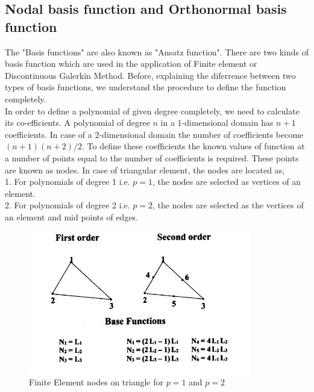 \documentclass[a4paper,12pt]{book}
\begin{document}
\subsection{Nodal basis function and Orthonormal basis function}

The "Basis functions" are also known as "Ansatz function". There are two kinds of basis function which are used in the application of Finite element or Discontinuous Galerkin Method. 
Before, explaining the diferrence between two types of basis functions, we understand the procedure to define the function completely. \\

In order to define a polynomial of given degree completely, we need to calculate its co-efficients. A polynomial of degree $n$ in a 1-dimensional domain has $n+1$ coefficients. In case of a 2-dimensional domain the number of coefficients become $(n+1)(n+2)/2$. To define these coefficients the known values of function at a number of points equal to the number of coefficients is required. These points are known as nodes. In case of triangular element, the nodes are located as,\\

1. For polynomials of degree 1 i.e. $p=1$, the nodes are selected as vertices of an element.\\
2. For polynomials of degree 2 i.e. $p=2$, the nodes are selected as the vertices of an element and mid points of edges.\\

\begin{figure}
  \includegraphics[width=\linewidth]{fem_triangle.jpg}
  \caption{Finite Element nodes on triangle for $p=1$ and $p=2$ \cite{plasma}}
  \label{fig:Nodes on Triangular Element}
\end{figure}
\end{document}
